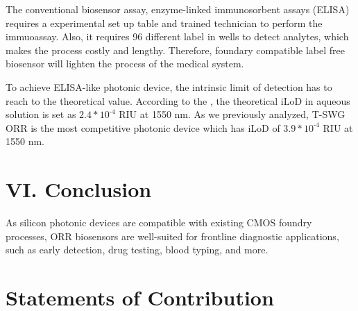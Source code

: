 \documentclass[aps,prl,twocolumn, superscriptaddress,nobalancelastpage]{revtex4}
\begin{document}

The conventional biosensor assay, enzyme-linked immunosorbent assays (ELISA) requires a experimental set up table and trained technician to perform the immuoassay. Also, it requires 96 different label in wells to detect analytes, which makes the process costly and lengthy. Therefore, foundary compatible label free biosensor will lighten the process of the medical system.

To achieve ELISA-like photonic device, the intrinsic limit of detection has to reach to the theoretical value. According to the \cite{labelfree2}, the theoretical iLoD in aqueous solution is set as $2.4*10^\text{-4}$ RIU at 1550 nm. As we previously analyzed, T-SWG ORR is the most competitive photonic device which has iLoD of $3.9*10^\text{-4}$ RIU at 1550 nm. 


\pagebreak




\section{VI. Conclusion}
\vspace{-1em}
As silicon photonic devices are compatible with existing CMOS foundry processes, ORR biosensors are well-suited for frontline diagnostic applications, such as early detection, drug testing, blood typing, and more. 






\section{Statements of Contribution}


\vspace{-1em}
\end{document}
